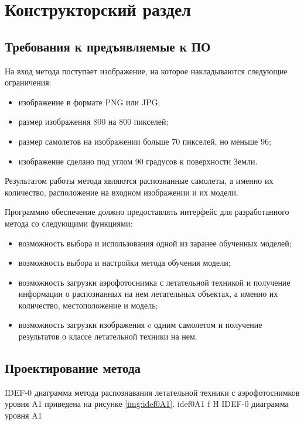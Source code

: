 \chapter{Конструкторский раздел}

\section{Требования к предъявляемые к ПО}
На вход метода поступает изображение, на которое накладываются следующие ограничения:
\begin{itemize}
	\item изображение в формате PNG или JPG;
	\item размер изображения 800 на 800 пикселей;
	\item размер самолетов на изображении больше 70 пикселей, но меньше 96;
	\item изображение сделано под углом 90 градусов к поверхности Земли.
\end{itemize}

Результатом работы метода являются распознанные самолеты, а именно их количество, расположение на входном изображении и их модели.

Программно обеспечение должно предоставлять интерфейс для разработанного метода со следующими функциями:
\begin{itemize}
	\item возможность выбора и использования одной из заранее обученных моделей;
	\item возможность выбора и настройки метода обучения модели;
	\item возможность загрузки аэрофотоснимка с летательной техникой и получение информации о распознанных на нем летательных объектах, а именно их количество, местоположение и модель;
	\item возможность загрузки изображения c одним самолетом и получение результатов о классе летательной техники на нем.
\end{itemize}


\section{Проектирование метода}
IDEF-0 диаграмма метода распознавания летательной техники с аэрофотоснимков уровня A1 приведена на рисунке \ref{img:idef0A1}.
{idef0A1} %
{f} %
{H} %
{\textwidth} %
{IDEF-0 диаграмма уровня A1} %

